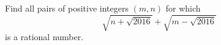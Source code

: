 Find all pairs of positive integers $(m,n)$ for which
\[
\sqrt{n+\sqrt{2016}}+\sqrt{m-\sqrt{2016}}
\]
is a rational number.
